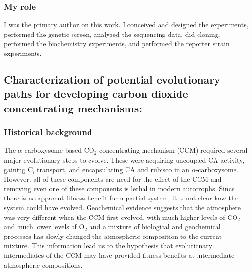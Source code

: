 \documentclass{article}
\begin{document}
\subsubsection{My role}
I was the primary author on this work.
I conceived and designed the experiments, performed the genetic screen, analyzed the sequencing data, did cloning, performed the biochemistry experiments, and performed the reporter strain experiments.
%
\nocite{Desmarais2019-yc,Desmarais2018-ac,Desmarais2019-dc}
\printbibliography[heading=none]

\leavevmode\newline

\newrefsection
\subsection{Characterization of potential evolutionary paths for developing carbon dioxide concentrating mechanisms:} \label{CCM_evo}
\subsubsection{Historical background}
The $\alpha$-carboxysome based CO$_2$ concentrating mechanism (CCM) required several major evolutionary steps to evolve.
These were acquiring uncoupled CA activity, gaining C$_i$ transport, and encapsulating CA and rubisco in an $\alpha$-carboxysome.
However, all of these components are need for the effect of the CCM and removing even one of these components is lethal in modern autotrophs.
Since there is no apparent fitness benefit for a partial system, it is not clear how the system could have evolved.
Geochemical evidence suggests that the atmosphere was very different when the CCM first evolved, with much higher levels of CO$_2$ and much lower levels of O$_2$ and a mixture of biological and geochemical processes has slowly changed the atmospheric composition to the current mixture.
This information lead us to the hypothesis that evolutionary intermediates of the CCM may have provided fitness benefits at intermediate atmospheric compositions.
%
\end{document}
